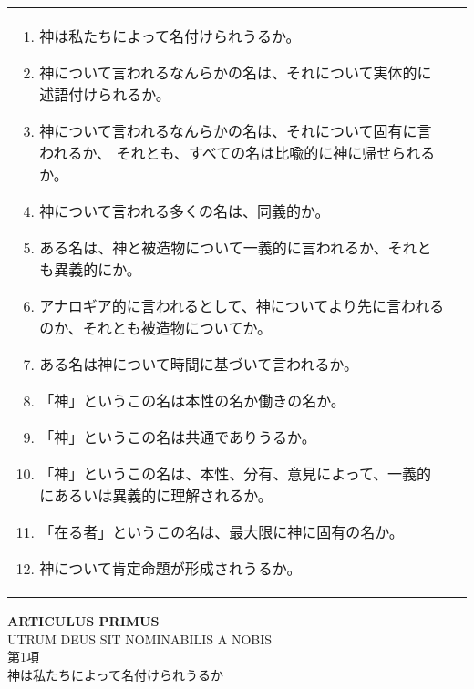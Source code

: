 \documentclass[10pt]{jsarticle} %
\begin{document}
\begin{longtable}{p{21em}p{21em}}
\vspace{1.3em}
\begin{enumerate}
 \item 神は私たちによって名付けられうるか。
 \item 神について言われるなんらかの名は、それについて実体的に述語付けられるか。
 \item 神について言われるなんらかの名は、それについて固有に言われるか、
       それとも、すべての名は比喩的に神に帰せられるか。
 \item 神について言われる多くの名は、同義的か。
 \item ある名は、神と被造物について一義的に言われるか、それとも異義的にか。
 \item アナロギア的に言われるとして、神についてより先に言われるのか、それとも被造物についてか。
 \item ある名は神について時間に基づいて言われるか。
 \item 「神」というこの名は本性の名か働きの名か。
 \item 「神」というこの名は共通でありうるか。
 \item 「神」というこの名は、本性、分有、意見によって、一義的にあるいは異義的に理解されるか。
 \item 「在る者」というこの名は、最大限に神に固有の名か。
 \item 神について肯定命題が形成されうるか。
\end{enumerate}
\end{longtable}

\newpage
{}
\begin{center}
 {\Large {\bf ARTICULUS PRIMUS}\\
UTRUM DEUS SIT NOMINABILIS A NOBIS}\\
{\large 第1項\\神は私たちによって名付けられうるか}
\end{center}
\end{document}
